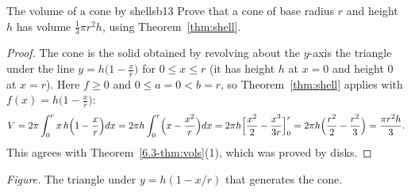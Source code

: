 \documentclass[11pt]{article}
\begin{document}
\begin{exmp}{The volume of a cone by shells}{b13}
Prove that a cone of base radius $r$ and height $h$ has volume $\frac13\pi r^2h$, using Theorem~\ref{thm:shell}.

\begin{proof}
The cone is the solid obtained by revolving about the $y$-axis the triangle under the line $y=h\bigl(1-\frac xr\bigr)$ for $0\le x\le r$ (it has height $h$ at $x=0$ and height $0$ at $x=r$). Here $f\ge0$ and $0\le a=0<b=r$, so Theorem~\ref{thm:shell} applies with $f(x)=h\bigl(1-\frac xr\bigr)$:
\[
V=2\pi\int_0^rx\,h\Bigl(1-\frac xr\Bigr)dx=2\pi h\int_0^r\Bigl(x-\frac{x^2}r\Bigr)dx=2\pi h\Bigl[\frac{x^2}2-\frac{x^3}{3r}\Bigr]_0^r=2\pi h\Bigl(\frac{r^2}2-\frac{r^2}3\Bigr)=\frac{\pi r^2h}3 .
\]
This agrees with Theorem~\ref{6.3-thm:vols}(1), which was proved by disks.
\end{proof}
\begin{center}
\par\small\emph{Figure.} The triangle under $y=h(1-x/r)$ that generates the cone.
\end{center}
\end{exmp}
\end{document}
